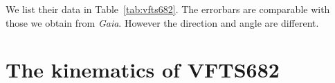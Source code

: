 \documentclass[apjl,twocolumn]{emulateapj}
\newcommand{\SdM}[1]{{{\color{brown}{#1}}}}
\newcommand{\kms}{{\,\mathrm{km\ s^{-1}}}}
\newcommand{\masyr}{\,\mathrm{mas}\,\mathrm{yr}^{-1}}
\DeclareRobustCommand{\Tabref}[1]{Table~\ref{#1}}
\begin{document}
We list their data in \Tabref{tab:vfts682}.  The errorbars are comparable with those we obtain from \emph{Gaia}.  However the direction and angle are different.  
\SdM{Can we please get theta Gaia and theta HST in the table.}












\section{The kinematics of VFTS682}
\label{sec:results}
\end{document}

